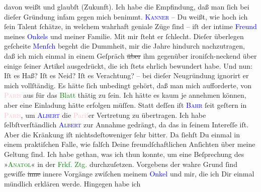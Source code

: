 \documentclass[twoside=false,titlepage=false,open=any, parskip=never, fontsize=12pt, headings=small, chapterprefix=false, appendixprefix=false]{scrbook}
\newcommand{\strikeout}[1]{\sout{#1}}
\newcommand{\pbposition}{\depth}
\newcommand{\pb}{\nobreak\hspace{0pt}\raisebox{-0.1em}{\raisebox{\pbposition}{\textnormal{|}}}\nobreak\hspace{0pt}}
\begin{document}
               davon weißt und glaubſt (Zukunft). Ich habe die Empfindung, daß man ſich bei dieſer
               Gründung infam gegen mich benimmt. \textsc{\textcolor{blue}{Kanner}{}\ledrightnote{\textcolor{blue}{Heinrich Kanner}}} – Du weißt, wie hoch ich ſein Talent ſchätze, in welchem {\pb}wahrhaft geniale Züge ſind – iſt der intime \textcolor{blue}{Freund}{} meines \textcolor{blue}{Onkels}{} und meiner Familie. Mit
               mir ſteht er ſchlecht. Dieſer überlegen geſcheite \textcolor{blue}{Menſch}{} begeht die Dummheit, mir die Jahre hindurch
               nachzutragen, daß ich mich einmal in einem Geſpräch \strikeout{über} ihm gegenüber ironiſch-neckend über einige ſeiner Artikel ausgedrückt,
               die ich ſtets ehrlich bewundert habe. Und nun: Iſt es Haß? Iſt es Neid? Iſt es
               Verachtung? – bei dieſer Neugründung ignorirt er mich vollſtändig. Es hätte {\pb}ſich unbedingt gehört, daß man mich aufforderte, von
                  \textsc{\textcolor{pink}{Paris}{}\ledrightnote{\textcolor{pink}{Paris}}} aus für das \textcolor{green}{Blatt}{} thätig
               zu ſein. Ich hätte es kaum je annehmen können, aber eine Einladung hätte erfolgen
               müſſen. Statt deſſen iſt \textsc{\textcolor{blue}{Bahr}{}\ledrightnote{\textcolor{blue}{Hermann Bahr}}} ſeit geſtern in \textsc{\textcolor{pink}{Paris}{}\ledrightnote{\textcolor{pink}{Paris}}}, um \textsc{\textcolor{blue}{Albert}{}\ledrightnote{\textcolor{blue}{Henri Albert}}} die \textcolor{pink}{Pariſ}{}\ledrightnote{\textcolor{pink}{Paris}}er Vertretung zu übertragen. Ich
               habe ſelbſtverſtändlich \textsc{\textcolor{blue}{Albert}{}\ledrightnote{\textcolor{blue}{Henri Albert}}} zur Annahme gedrängt, da das in ſeinem Intereſſe iſt. Aber die Kränkung iſt
               nichtsdeſtoweniger ſehr bitter. Da ſiehſt Du einmal in einem praktiſchen Falle, wie
               falſch Deine freundſchaftlichen Anſichten über meine Geltung ſind.\pend
           \pstart
           {\pb}Ich habe gethan, was ich thun konnte, um eine
               Beſprechung des »\textsc{\textcolor{green}{Anatol}{}\ledrightnote{\textcolor{green}{Anatol}}}« in der \textcolor{green}{Frkf. Ztg.}{}\ledrightnote{\textcolor{green}{Frankfurter Zeitung}} durchzuſetzen.
               Vorgebens der wahre Grund ſind gewiſſe \strikeout{inne} innere
               Vorgänge zwiſchen meinem \textcolor{blue}{Onkel}{} und mir, die ich Dir einmal mündlich erklären werde. Hingegen habe ich
\end{document}
